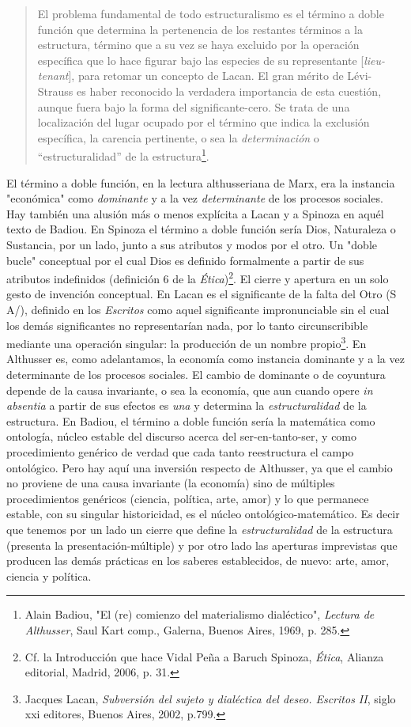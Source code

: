 \documentclass{book}
\begin{document}
\begin{quote}
El problema fundamental de todo estructuralismo es el término a doble
función que determina la pertenencia de los restantes términos a la
estructura, término que a su vez se haya excluido por la operación
específica que lo hace figurar bajo las especies de su representante
{[}\emph{lieu-tenant}{]}, para retomar un concepto de Lacan. El gran
mérito de Lévi-Strauss es haber reconocido la verdadera importancia de
esta cuestión, aunque fuera bajo la forma del significante-cero. Se
trata de una localización del lugar ocupado por el término que indica la
exclusión específica, la carencia pertinente, o sea la
\emph{determinación} o ``estructuralidad'' de la estructura\footnote{Alain
  Badiou, "El (re) comienzo del materialismo dialéctico", \emph{Lectura
  de Althusser}, Saul Kart comp., Galerna, Buenos Aires, 1969, p. 285.}.
\end{quote}

El término a doble función, en la lectura althusseriana de Marx, era la
instancia "económica" como \emph{dominante} y a la vez
\emph{determinante} de los procesos sociales. Hay también una alusión
más o menos explícita a Lacan y a Spinoza en aquél texto de Badiou. En
Spinoza el término a doble función sería Dios, Naturaleza o Sustancia,
por un lado, junto a sus atributos y modos por el otro. Un "doble bucle"
conceptual por el cual Dios es definido formalmente a partir de sus
atributos indefinidos (definición 6 de la \emph{Ética})\footnote{Cf. la
  Introducción que hace Vidal Peña a Baruch Spinoza, \emph{Ética},
  Alianza editorial, Madrid, 2006, p. 31.}. El cierre y apertura en un
solo gesto de invención conceptual. En Lacan es el significante de la
falta del Otro (S A/), definido en los \emph{Escritos} como aquel
significante impronunciable sin el cual los demás significantes no
representarían nada, por lo tanto circunscribible mediante una operación
singular: la producción de un nombre propio\footnote{Jacques Lacan,
  \emph{Subversión del sujeto y dialéctica del deseo. Escritos II},
  siglo xxi editores, Buenos Aires, 2002, p.799.}. En Althusser es, como
adelantamos, la economía como instancia dominante y a la vez
determinante de los procesos sociales. El cambio de dominante o de
coyuntura depende de la causa invariante, o sea la economía, que aun
cuando opere \emph{in absentia} a partir de sus efectos es \emph{una} y
determina la \emph{estructuralidad} de la estructura. En Badiou, el
término a doble función sería la matemática como ontología, núcleo
estable del discurso acerca del ser-en-tanto-ser, y como procedimiento
genérico de verdad que cada tanto reestructura el campo ontológico. Pero
hay aquí una inversión respecto de Althusser, ya que el cambio no
proviene de una causa invariante (la economía) sino de múltiples
procedimientos genéricos (ciencia, política, arte, amor) y lo que
permanece estable, con su singular historicidad, es el núcleo
ontológico-matemático. Es decir que tenemos por un lado un cierre que
define la \emph{estructuralidad} de la estructura (presenta la
presentación-múltiple) y por otro lado las aperturas imprevistas que
producen las demás prácticas en los saberes establecidos, de nuevo:
arte, amor, ciencia y política.
\end{document}
